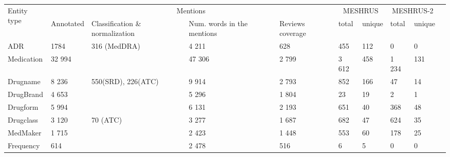\begin{tabular}{|l|l|p{}|p{}|p{}|p{}|l|l|l|l|} 
\hline
\multirow{2}{*}{Entity type} & \multicolumn{4}{c|}{Mentions}                              & \multicolumn{2}{c|}{MESHRUS} & \multicolumn{2}{c|}{MESHRUS-2}  \\ 
\cline{2-9}
                                                                                   & Annotated   & Classification \& normalization & Num. words in the mentions & Reviews coverage & total & unique               & total & unique                  \\ 
\hline
ADR & 1784 & 316 (MedDRA) & 4 211 & 628 & 455   & 112                  & 0     & 0                       \\ 
\hline
Medication                                                                         & 32 994 &    & 47 306 & 2 799             & 3 612  & 458                  & 1 234  & 131                     \\ 
\hline
Drugname                                                                           & 8 236  & 550(SRD), 226(ATC)    & 9 914                         & 2 793 & 852   & 166                  & 47    & 14                      \\ 
\hline
DrugBrand                                                                          & 4 653  &     & 5 296                        & 1 804             & 23    & 19                   & 2     & 1                       \\ 
\hline
Drugform & 5 994  &  & 6 131 & 2 193             & 651   & 40                   & 368   & 48                      \\ 
\hline
Drugclass & 3 120  & 70 (ATC) & 3 277 & 1 687              & 682   & 47                   & 624   & 35                      \\ 
\hline
MedMaker                                                                           & 1 715    &     & 2 423 & 1 448              & 553   & 60                   & 178   & 25                      \\ 
\hline
Frequency                                                                          & 614    &     & 2 478 & 516              & 6     & 5                    & 0     & 0                       \\ 

\end{tabular}
